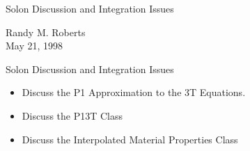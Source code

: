 \documentclass{myslidehead}
\begin{document}
\pagestyle{headings}


\begin{slide}

  \begin{center}
    Solon Discussion and Integration Issues

    Randy M. Roberts \\
    May 21, 1998
  \end{center}

\end{slide}


\begin{slide}

  \begin{center}
    \large Solon Discussion and Integration Issues
  \end{center}

  \begin{itemize}
    \item Discuss the P1 Approximation to the 3T Equations.
    \item Discuss the P13T Class
    \item Discuss the Interpolated Material Properties Class
  \end{itemize}

\end{slide}

\end{document}
